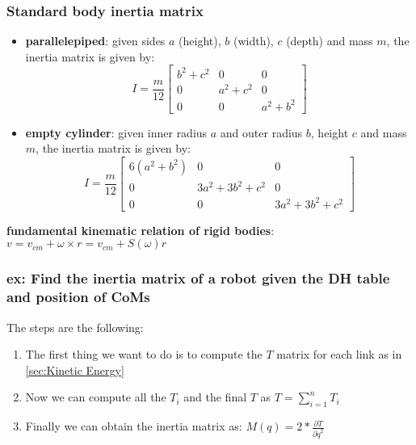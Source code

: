 \documentclass[a4paper,12pt]{article}
\begin{document}
\subsubsection{Standard body inertia matrix}
\begin{itemize}
    \item \textbf{parallelepiped}: given sides $a$ (height), $b$ (width), $c$ (depth)
     and mass $m$, the inertia matrix is given by: \begin{equation}
        I = \frac{m}{12} \begin{bmatrix}
            b^2 + c^2 & 0 & 0 \\
            0 & a^2 + c^2 & 0 \\
            0 & 0 & a^2 + b^2
        \end{bmatrix}
    \end{equation}
    \item \textbf{empty cylinder}: given inner radius $a$ and outer radius $b$, height $c$ and mass $m$,
     the inertia matrix is given by: \begin{equation}
        I = \frac{m}{12} \begin{bmatrix}
            6(a^2 + b^2) & 0 & 0 \\
            0 & 3a^2 + 3b^2 + c^2 & 0 \\
            0 & 0 & 3a^2 + 3b^2 + c^2
        \end{bmatrix}
    \end{equation}
\end{itemize}
\textbf{fundamental kinematic relation of rigid bodies}:
 $v = v_{cm} + \omega \times r = v_{cm} + S(\omega) r$
\subsubsection{ex: Find the inertia matrix of a robot given the DH table and position of CoMs}
The steps are the following:
\begin{enumerate}
    \item The first thing we want to do is to compute the $T$ matrix for each link as in \ref{sec:Kinetic Energy}
    \item Now we can compute all the $T_i$ and the final $T$ as $T = \sum_{i=1}^{n} T_i$
    \item Finally we can obtain the inertia matrix as: $M(q) = 2*\frac{\partial T}{\partial \dot{q}^2}$
\end{enumerate}
\end{document}
